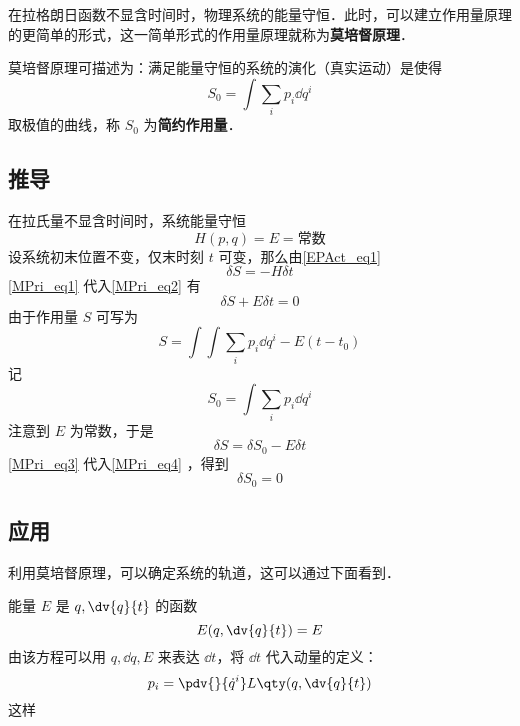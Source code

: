 在拉格朗日函数不显含时间时，物理系统的能量守恒．此时，可以建立作用量原理的更简单的形式，这一简单形式的作用量原理就称为\textbf{莫培督原理}．

莫培督原理可描述为：满足能量守恒的系统的演化（真实运动）是使得
\begin{equation}
S_0=\int\sum_i p_i\dd q^i
\end{equation}
取极值的曲线，称 $S_0$ 为\textbf{简约作用量}．
\subsection{推导}
在拉氏量不显含时间时，系统能量守恒
\begin{equation}\label{MPri_eq1}
H(p,q)=E=\text{常数}
\end{equation}
设系统初末位置不变，仅末时刻 $t$ 可变，那么由\autoref{EPAct_eq1}~
\begin{equation}\label{MPri_eq2}
\delta S=-H\delta t
\end{equation}
\autoref{MPri_eq1} 代入\autoref{MPri_eq2} 有
\begin{equation}\label{MPri_eq4}
\delta S+E\delta t=0
\end{equation}
由于作用量 $S$ 可写为
\begin{equation}
S=\int \int\sum_i p_i\dd q^i-E(t-t_0)
\end{equation}
记
\begin{equation}
S_0=\int\sum_i p_i\dd q^i
\end{equation}
注意到 $E$ 为常数，于是
\begin{equation}\label{MPri_eq3}
\delta S=\delta S_0-E\delta t
\end{equation}
\autoref{MPri_eq3} 代入\autoref{MPri_eq4} ，得到
\begin{equation}
\delta S_0=0
\end{equation}
\subsection{应用}
利用莫培督原理，可以确定系统的轨道，这可以通过下面看到．

能量 $E$ 是 $q,\dv{q}{t}$ 的函数 
\begin{equation}
E(q,\dv{q}{t})=E
\end{equation}
由该方程可以用 $q,\dd q,E$ 来表达 $\dd t$，将 $\dd t$ 代入动量的定义：
\begin{equation}
p_i=\pdv{}{\dot q^i}L\qty(q,\dv{q}{t})
\end{equation}
这样

